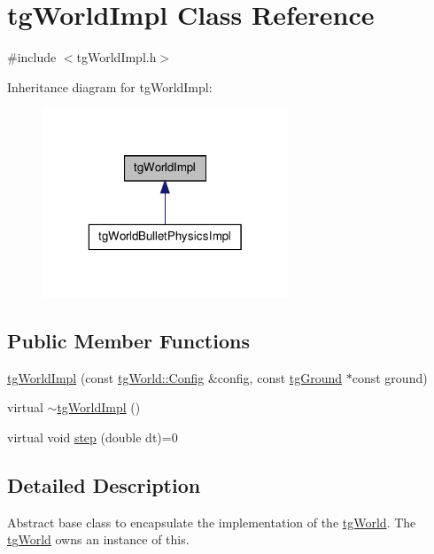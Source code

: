 \hypertarget{classtg_world_impl}{\section{tg\-World\-Impl Class Reference}
\label{classtg_world_impl}
}


{\ttfamily \#include $<$tg\-World\-Impl.\-h$>$}



Inheritance diagram for tg\-World\-Impl\-:\nopagebreak
\begin{figure}[H]
\begin{center}
\leavevmode
\includegraphics[width=208pt]{classtg_world_impl__inherit__graph}
\end{center}
\end{figure}
\subsection*{Public Member Functions}
\begin{DoxyCompactItemize}
\item 
\hyperlink{classtg_world_impl_aa87edc3655ae90fc14e46c724646daf3}{tg\-World\-Impl} (const \hyperlink{structtg_world_1_1_config}{tg\-World\-::\-Config} \&config, const \hyperlink{classtg_ground}{tg\-Ground} $\ast$const ground)
\item 
virtual \hyperlink{classtg_world_impl_ab7ea78aa20cfc49ea5c9a606755f63e9}{$\sim$tg\-World\-Impl} ()
\item 
virtual void \hyperlink{classtg_world_impl_a105ab0706232a897663d181afd960866}{step} (double dt)=0
\end{DoxyCompactItemize}


\subsection{Detailed Description}
Abstract base class to encapsulate the implementation of the \hyperlink{classtg_world}{tg\-World}. The \hyperlink{classtg_world}{tg\-World} owns an instance of this. 


